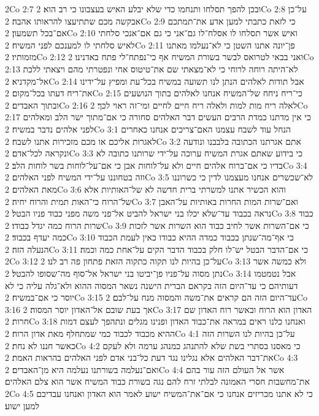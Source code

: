 2Co 2:7  ובכן להפך תסלחו ותנחמו כדי שלא יבלע האיש בעצבונו כי רב הוא׃
2Co 2:8  על־כן אבקשה מכם שתתיעצו להראותו אהבה׃
2Co 2:9  כי לזאת כתבתי למען אדע את־תמתכם אם־בכל תשמעון׃
2Co 2:10  ואיש אשר תסלחו לו אסלח־לו גם־אני כי גם אם־אנכי סלחתי לאיש סלחתי לו למענכם לפני המשיח׃
2Co 2:11  פן־יונה אתנו השטן כי לא־נעלמו מאתנו מזמותיו׃
2Co 2:12  ואני בבאי לטרואס לבשר בשורת המשיח אף כי־נפתח־לי פתח באדנינו׃
2Co 2:13  לא־היתה רוחה לרוחי כי לא־מצאתי שם את־טיטוס אחי ונפטרתי מהם ויצאתי ללכת אל־מקדניא׃
2Co 2:14  אבל תודות לאלהים הנתן לנו תשועה במשיח בכל־עת ומפיץ על־ידינו את־ריח דעתו בכל־מקום׃
2Co 2:15  כי־ריח ניחח של־המשיח אנחנו לאלהים בתוך הנושעים ובתוך האבדים׃
2Co 2:16  לאלה ריח מות למות ולאלה ריח חיים לחיים ומי־זה ראוי לכך׃
2Co 2:17  כי אין מדתנו כמדת הרבים העשים דבר האלהים סחורה כי אם־מתוך ישר הלב ומאלהים לפני אלהים נדבר במשיח׃
2Co 3:1  הנחל עוד לשבח עצמנו האם־צריכים אנחנו כאחרים לאגרות אליכם או מכם מזכירות אתנו לשבח׃
2Co 3:2  אתם אגרתנו הכתובה בלבבנו ונודעה ונקראה לכל־אדם׃
2Co 3:3  כי בידוע שאתם אגרת המשיח ערוכה על־ידי שרותנו כתובה לא בדיו כי אם־ברוח אלהים חיים ולא על־לוחות אבן כי אם־על־לוחות בשר לוחות הלב׃
2Co 3:4  וזה בטחוננו על־ידי המשיח לפני האלהים׃
2Co 3:5  לא־שכשרים אנחנו מעצמנו לדין כי כשרוננו מאת האלהים׃
2Co 3:6  והוא הכשיר אתנו למשרתי ברית חדשה לא של־האותיות אלא של־הרוח כי־האות תמית והרוח יחיה׃
2Co 3:7  ואם־שרות המות החרות באותיות על־האבן נראה בכבוד עד־שלא יכלו בני ישראל להביט אל־פני משה מפני כבוד פניו הבטל׃
2Co 3:8  כבוד שרות הרוח כמה יגדל כבודו׃
2Co 3:9  כי אם־השרות אשר לחיב כבוד הוא השרות אשר לזכות כמה יעדף בכבוד׃
2Co 3:10  כי אף־מה־שנתן בכבוד כמדה ההיא כבודו כאין לעמת הכבוד הנעלה הזה׃
2Co 3:11  כי אם־הדבר הבטל יש־לו חלק בכבוד הדבר הקים על־אחת כמה וכמה׃
2Co 3:12  על־כן בהיות לנו תקוה כתקוה הזאת פתחון פה רב לנו׃
2Co 3:13  ולא כמשה אשר נתן מסוה על־פניו פן־יביטו בני ישראל אל־סוף מה־שסופו להבטל׃
2Co 3:14  אבל נטמטמו דעותיהם כי עד־היום הזה בקראם הברית הישנה נשאר המסוה ההוא ולא־גלה עליה כי לא יוסר כי אם־במשיח׃
2Co 3:15  עד־היום הזה הם קראים את־משה והמסוה מנח על־לבם׃
2Co 3:16  אך בעת שובם אל־האדון יוסר המסוה׃
2Co 3:17  האדון הוא הרוח ובאשר רוח האדון שם חרות׃
2Co 3:18  ואנחנו כלנו ראים במראה את־כבוד האדון ופנינו מגלים ונתהפך לעצם דמות ההיא מכבוד לכבוד כמי שמתחלף מאת אדון הרוח׃
2Co 4:1  על־כן בהיות לנו השרות הזה כאשר חננו לא נחת׃
2Co 4:2  כי מאסנו בסתרי בשת שלא להתנהג כמנהג ערמה ולא לעקם את־דבר האלהים אלא נגלינו נגד דעת כל־בני אדם לפני האלהים בהראות האמת׃
2Co 4:3  ואם־נעלמה בשורתנו נעלמה היא מן־האבדים׃
2Co 4:4  אשר אל העולם הזה עור בהם את־מחשבות חסרי האמונה לבלתי זרח להם נגה בשורת כבוד המשיח אשר הוא צלם האלהים׃
2Co 4:5  כי לא אתנו מכריזים אנחנו כי אם־את־המשיח ישוע לאמר הוא האדון ואנחנו עבדיכם למען ישוע׃
